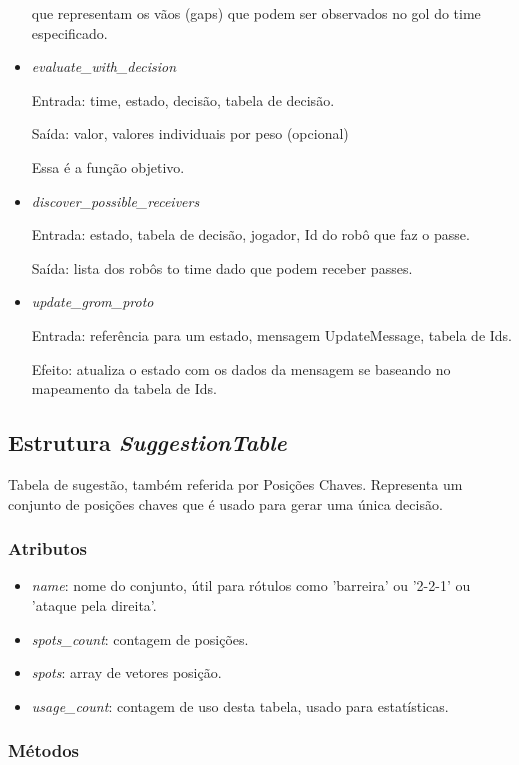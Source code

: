 \begin{itemize}
    que representam os vãos (gaps) que podem ser observados no gol do time
    especificado.
  \item \textit{evaluate_with_decision}
    \par Entrada: time, estado, decisão, tabela de decisão.
    \par Saída: valor, valores individuais por peso (opcional)
    \par Essa é a função objetivo.
  \item \textit{discover_possible_receivers}
    \par Entrada: estado, tabela de decisão, jogador, Id do robô que faz o
    passe.
    \par Saída: lista dos robôs to time dado que podem receber passes.
  \item \textit{update_grom_proto}
    \par Entrada: referência para um estado, mensagem UpdateMessage, tabela de
    Ids.
    \par Efeito: atualiza o estado com os dados da mensagem se baseando no
    mapeamento da tabela de Ids.
\end{itemize}

\subsection*{Estrutura \textit{SuggestionTable}}

Tabela de sugestão, também referida por Posições Chaves.  Representa um conjunto
de posições chaves que é usado para gerar uma única decisão.

\subsubsection*{Atributos}

\begin{itemize}
  \item \textit{name}: nome do conjunto, útil para rótulos como 'barreira' ou
    '2-2-1' ou 'ataque pela direita'.
  \item \textit{spots_count}: contagem de posições.
  \item \textit{spots}: array de vetores posição.
  \item \textit{usage_count}: contagem de uso desta tabela, usado para
    estatísticas.
\end{itemize}

\subsubsection*{Métodos}

